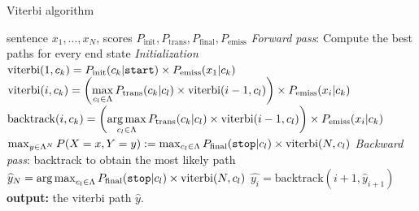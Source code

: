 \begin{algorithm}[t]
   \caption{Viterbi algorithm \label{alg:viterbi}}
\begin{algorithmic}[1]
    sentence $x_1,\ldots,x_N$, scores $P_{\mathrm{init}}, P_{\mathrm{trans}}, P_{\mathrm{final}}, P_{\mathrm{emiss}}$
        \STATE  \emph{Forward pass}: Compute the best paths for every end state
        \STATE \emph{Initialization}
        \STATE $\mathrm{viterbi}(1,c_k) = P_{\mathrm{init}}(c_k|\text{\tt start}) \times 
P_{\mathrm{emiss}}(x_1 | c_k)$
        \ENDFOR 
          \STATE $\mathrm{viterbi}(i, c_k) = \left( \displaystyle \max_{c_l \in \Lambda} P_{\mathrm{trans}}(c_k | c_l) \times \mathrm{viterbi}(i-1, c_l) \right) \times P_{\mathrm{emiss}}(x_i | c_k)$
          \STATE $\mathrm{backtrack}(i, c_k) = \left( \displaystyle \operatorname*{arg\,max}_{c_l \in \Lambda} P_{\mathrm{trans}}(c_k | c_l) \times \mathrm{viterbi}(i-1, c_l) \right) \times P_{\mathrm{emiss}}(x_i | c_k)$
         \ENDFOR 
        \ENDFOR 
       \STATE 
  $\max_{y \in \Lambda^N} P(X=x,Y=y) := \max_{c_l \in \Lambda} P_{\mathrm{final}}(\text{\tt stop} | c_l) \times \mathrm{viterbi}(N, c_l)$        
        \STATE
       \STATE \emph{Backward pass}: backtrack to obtain the most likely path 
	  \STATE $\widehat{y}_N = \operatorname*{arg\,max}_{c_l \in \Lambda} P_{\mathrm{final}}(\text{\tt stop} | c_l) \times \mathrm{viterbi}(N, c_l)$ 
        \STATE $\widehat{y_i} = \mathrm{backtrack}(i+1, \widehat{y}_{i+1})$
        \ENDFOR 
       \STATE \textbf{output:} the viterbi path $\widehat{y}$.
\end{algorithmic}
\end{algorithm}

